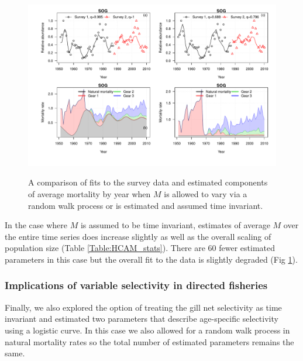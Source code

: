 \begin{figure}[!tbp]
	\includegraphics[width=\textwidth]{../FIGS/iscam_fig_HCAM_qFix_Mfix.pdf}\\
	\caption{A comparison of fits to the survey data and estimated components of average mortality by year when $M$ is allowed to vary via a random walk process or is estimated and assumed time invariant. }\label{fig:qFix_Mfix}
\end{figure}
		
In the case where $M$ is assumed to be time invariant, estimates of average $M$ over the entire time series does increase slightly as well as the overall scaling of population size (Table \ref{Table:HCAM_stats}).  There are 60 fewer estimated parameters in this case but the overall fit to the data is slightly degraded (Fig \ref{fig:qFix_Mfix}).
		
		\subsubsection{Implications of variable selectivity in directed fisheries}

Finally, we also explored the option of treating the gill net selectivity as time invariant and estimated two parameters that describe age-specific selectivity using a logistic curve.	In this case we also allowed for a random walk  process in natural mortality rates so the total number of estimated parameters remains the same. 

